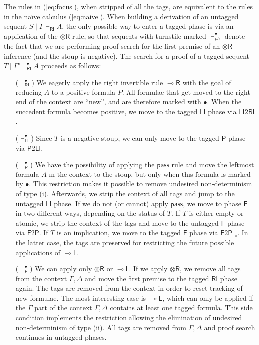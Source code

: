 \documentclass[copyright,creativecommons]{eptcs}
\theoremstyle{definition}
\newcommand{\tr}{\otimes \mathsf{R}}
\newcommand{\lright}{{\multimap}\mathsf{R}}
\newcommand{\lleft}{{\multimap}\mathsf{L}}
\newcommand{\pass}{\mathsf{pass}}
\newcommand{\lolli}{\multimap}
\newcommand{\RI}{\mathsf{RI}}
\newcommand{\LI}{\mathsf{LI}}
\newcommand{\Pass}{\mathsf{P}}
\newcommand{\F}{\mathsf{F}}
\begin{document}
The rules in (\ref{eq:focus}), when stripped of all the tags, are equivalent to the rules in the na{\"i}ve calculus (\ref{eq:naive}). When building a derivation of an untagged sequent $S \mid \Gamma \vdash_\RI A$, the only possible way to enter a tagged phase is via an application of the $\tr$ rule, so that sequents with turnstile marked $\vdash_{ph}^\bullet$ denote the fact that we are performing proof search for the first premise of an $\tr$ inference (and the stoup is negative).
The search for a proof of a tagged sequent $T \mid \Gamma^\circ \vdash^\bullet_\RI A$ proceeds as follows:
\begin{itemize}
\item[($\vdash^\bullet_\RI$)] We eagerly apply the right invertible rule $\lright$ with the goal of reducing $A$ to a positive formula $P$. All formulae that get moved to the right end of the context are ``new'', and are therefore marked with $\bullet$.
  When the succedent formula becomes positive, we move to the tagged $\LI$ phase via $\LI2\RI$.
\item[($\vdash^\bullet_\LI$)] Since $T$ is a negative stoup, we can only move to the tagged $\Pass$ phase via $\Pass2\LI$.
\item[($\vdash^\bullet_\Pass$)] We have the possibility of applying the $\pass$ rule and move the leftmost formula $A$ in the context to the stoup, but only when this formula is marked by $\bullet$. This restriction makes it possible to remove undesired non-determinism of type (i). Afterwards, we strip the context of all tags and jump to the untagged $\LI$ phase. If we do not (or cannot) apply $\pass$, we move to phase $\F$  in two different ways, depending on the status of $T$. If $T$ is either empty or atomic, we strip the context of the tags and move to the untagged $\F$ phase via $\F2\Pass$. If $T$ is an implication, we move to the tagged $\F$ phase via $\F2\Pass_\lolli$. In the latter case, the tags are preserved for restricting the future possible applications of $\lleft$.
\item[($\vdash^\bullet_\F$)] We can apply only $\tr$ or $\lleft$. If we apply $\tr$, we remove all tags from the context $\Gamma, \Delta$ and move the first premise to the tagged $\RI$ phase again. The tags are removed from the context in order to reset tracking of new formulae. The most interesting case is $\lleft$, which can only be applied if the $\Gamma$ part of the context $\Gamma, \Delta$ contains at least one tagged formula. This side condition implements the restriction allowing the elimination of undesired non-determinism of type (ii). All tags are removed from $\Gamma, \Delta$ and proof search continues in untagged phases.
\end{itemize}
\end{document}
